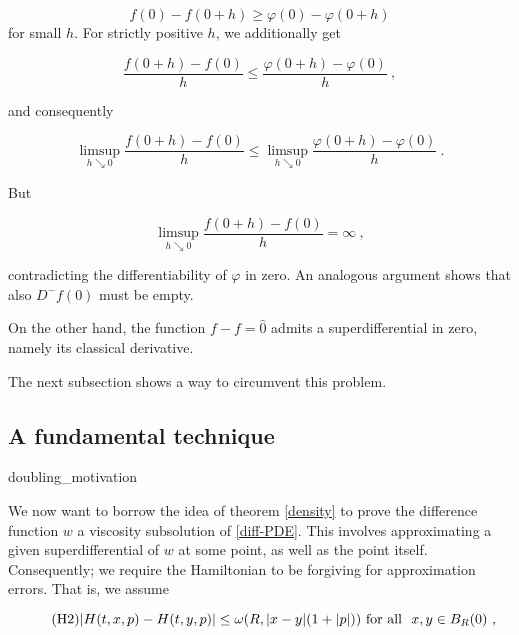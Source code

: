 		\begin{equation*}
			f(0) - f(0 + h) \geq \varphi(0) - \varphi(0 + h) 
		\end{equation*}
		for small $ h $. For strictly positive $ h $, we additionally get
		
		\begin{equation*}
			\frac{f( 0 + h) - f(0)}{h} \leq \frac{\varphi(0 + h) - \varphi(0)}{h} \ ,
		\end{equation*}
		
		and consequently 
		
		\begin{equation*}
			\limsup\limits_{h \searrow 0} \frac{f( 0 + h) - f(0)}{h} \leq \limsup\limits_{h \searrow 0} \frac{\varphi(0 + h) - \varphi(0)}{h} \ .
		\end{equation*}
		
		But 
		
		\begin{equation*}
			\limsup\limits_{h \searrow 0} \frac{f( 0 + h) - f(0)}{h} = \infty \ ,
		\end{equation*}
		
		contradicting the differentiability of $ \varphi $ in zero. An analogous argument shows that also $ D^{-}f(0) $ must be empty.
		
		On the other hand, the function $ f - f = \hat{0} $ admits a superdifferential in zero, namely its classical derivative.
		
		The next subsection shows a way to circumvent this problem.
		
	\subsection{A fundamental technique}
	
		 {doubling_motivation}
		 
		 We now want to borrow the idea of theorem \ref{density} to prove the difference function $ w $ a viscosity subsolution of \eqref{diff-PDE}. This involves approximating a given superdifferential of $ w $ at some point, as well as the point itself. Consequently; we require the Hamiltonian to be forgiving for approximation errors. That is, we assume
		 
		 \begin{equation}
		 \tag{H2}
		 \lvert H(t, x, p) - H(t, y, p) \rvert \leq \omega(R, \lvert x - y \rvert (1 + \lvert p \rvert)) \hbox{ for all } \ x, y \in B_R(0) \ ,
		 \label{eqn:H2}
		 \end{equation}
		 
